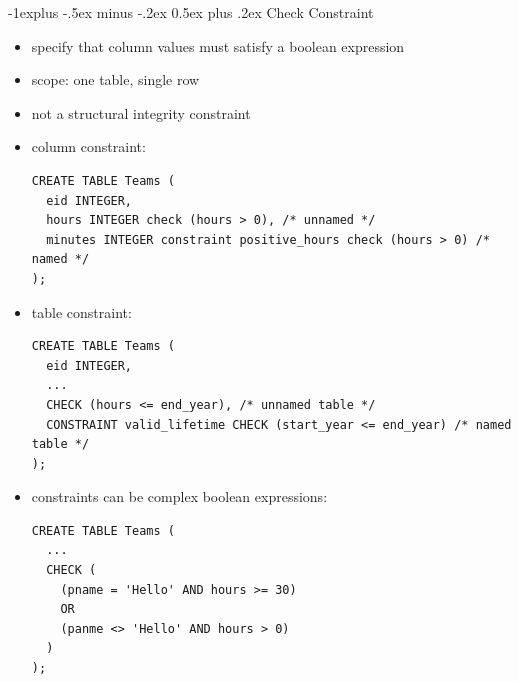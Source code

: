 \documentclass[10pt, landscape]{article}
\makeatletter
\renewcommand{\subsection}{\@startsection{subsection}{2}{0mm}%
  {-1explus -.5ex minus -.2ex}%
  {0.5ex plus .2ex}%
{\normalfont\normalsize\bfseries}}
\makeatother
\begin{document}
\begin{multicols}{3}
  \subsection{Check Constraint}
  \begin{itemize}
    \item specify that column values must satisfy a boolean expression
    \item scope: one table, single row
    \item not a structural integrity constraint
    \item column constraint:
      \begin{lstlisting}[style=mySQL]
CREATE TABLE Teams (
  eid INTEGER,
  hours INTEGER check (hours > 0), /* unnamed */
  minutes INTEGER constraint positive_hours check (hours > 0) /* named */
);  
      \end{lstlisting}
    \item table constraint:
      \begin{lstlisting}[style=mySQL]
CREATE TABLE Teams (
  eid INTEGER,
  ...
  CHECK (hours <= end_year), /* unnamed table */
  CONSTRAINT valid_lifetime CHECK (start_year <= end_year) /* named table */
);  
      \end{lstlisting}
    \item {} constraints can be complex boolean expressions:
      \begin{lstlisting}[style=mySQL]
CREATE TABLE Teams (
  ...
  CHECK (
    (pname = 'Hello' AND hours >= 30)
    OR
    (panme <> 'Hello' AND hours > 0)
  )
);  
      \end{lstlisting}
  \end{itemize}


\end{multicols}
\end{document}
